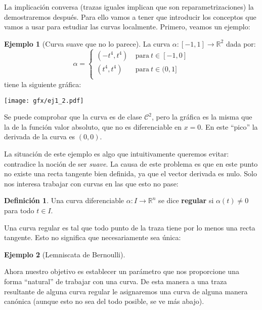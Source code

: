 \documentclass{article}
\theoremstyle{definition}
\newtheorem{define}{Definición}
\newtheorem{ejem}{Ejemplo}
\newcommand{\reales}{\mathbb{R}}
\newcommand{\claseck}[1]{\mathcal{C}^{#1}}
\begin{document}
La implicación conversa (trazas iguales implican que son reparametrizaciones) la demostraremos después. Para ello vamos a tener que introducir los conceptos que vamos a usar para estudiar las curvas localmente. Primero, veamos un ejemplo:

\begin{ejem}[Curva suave que no lo parece]
	La curva $\alpha: [-1, 1] \rightarrow \reales^{2}$ dada por:
	\begin{equation}
		\alpha = \left\lbrace \begin{array}{lr}
			(-t^4, t^4 )& \ \text{para}\ t \in [-1, 0]\\
			(t^4, t^4 )& \ \text{para}\ t \in (0, 1]\\
		\end{array} \right.
	\end{equation}
	tiene la siguiente gráfica:
	\begin{center}
		\texttt{[image: gfx/ej1\_2.pdf]}
	\end{center}
	Se puede comprobar que la curva es de clase $\claseck{2}$, pero la gráfica es la misma que la de la función valor absoluto, que no es diferenciable en $x=0$. En este ``pico'' la derivada de la curva es $(0, 0)$.
\end{ejem}
La situación de este ejemplo es algo que intuitivamente queremos evitar: contradice la noción de ser \textit{suave}. La causa de este problema es que en este punto no existe una recta tangente bien definida, ya que el vector derivada es nulo. Solo nos interesa trabajar con curvas en las que esto no pase:

\begin{define}
	Una curva diferenciable $\alpha: I \rightarrow \reales^{n}$ se dice \textbf{regular} si $\alpha(t) \neq 0$ para todo $t \in I$. 
\end{define}

Una curva regular es tal que todo punto de la traza tiene por lo menos una recta tangente. Esto no significa que necesariamente sea única:

\begin{ejem}[Lemniscata de Bernoulli]

\end{ejem}

Ahora nuestro objetivo es establecer un parámetro que nos proporcione una forma ``natural'' de trabajar con una curva. De esta manera a una traza resultante de alguna curva regular le asignaremos una curva de alguna manera canónica (aunque esto no sea del todo posible, se ve más abajo).
\end{document}
